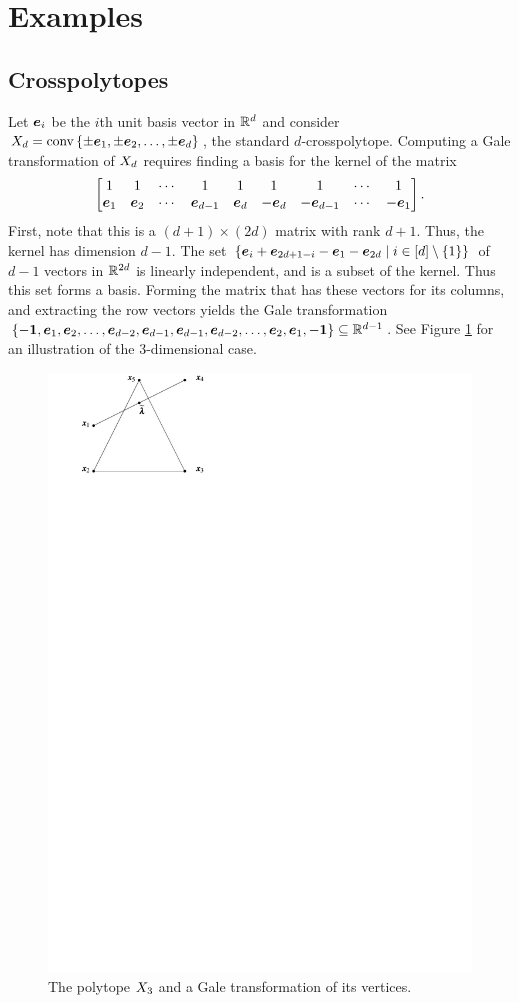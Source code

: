\section{Examples}

\subsection{Crosspolytopes}
    Let \(\bm{e}_i\) be the \(i\)th unit basis vector in \(\mathbb{R}^{d}\) and consider \(X_{d}=\operatorname{conv}\left\{\pm\bm{e}_1,\pm\bm{e}_2,\dotsc,\pm\bm{e}_d\right\}\), the standard \(d\)-crosspolytope.  Computing a Gale transformation of \(X_{d}\) requires finding a basis for the kernel of the matrix
        \[
            \begin{bmatrix}
                1       &   1       &   \dotsb &   1&           1       &   1        &   1            &   \dotsb &   1          \\
                \bm{e}_1 &   \bm{e}_2 &   \dotsb &   \bm{e}_{d-1} &\bm{e}_d &   -\bm{e}_d &   -\bm{e}_{d-1} &   \dotsb &   -\bm{e}_1
            \end{bmatrix}.
        \]
    First, note that this is a \((d+1)\times(2d)\) matrix with rank \(d+1\).  Thus, the kernel has dimension \(d-1\).  The set \(\setb{\ve e_i+\ve e_{2d+1-i}-\ve e_1-\ve e_{2d}}{i\in\brac d\setminus\seta{1}}\) of \(d-1\) vectors in \(\mathbb{R}^{2d}\) is linearly independent, and is a subset of the kernel.  Thus this set forms a basis.  Forming the matrix that has these vectors for its columns, and extracting the row vectors yields the Gale transformation \(\left\{-\bm{1},\bm{e}_1,\bm{e}_2,\dotsc,\bm{e}_{d-2},\bm{e}_{d-1},\bm{e}_{d-1},\bm{e}_{d-2},\dotsc,\bm{e}_2,\bm{e}_1,-\bm{1}\right\}\subseteq\mathbb{R}^{d-1}\).  See Figure \ref{Fig:xp3Gale} for an illustration of the \(3\)-dimensional case.
    \begin{figure}[hbt]
        \centering
            \includegraphics[width=.7\textwidth, page=14]{pictures.pdf}
        \caption{The polytope $X_{3}$ and a Gale transformation of its vertices.\label{Fig:xp3Gale}}
    \end{figure}
